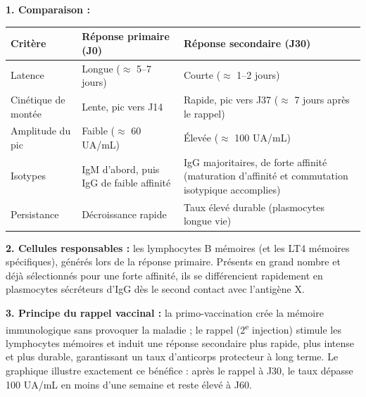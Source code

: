 \documentclass[11pt]{article}
\newcommand{\cle}[1]{{\popxbold\color{popdark}#1}}
\begin{document}
\begin{corrige}
\textbf{1. Comparaison :}
\begin{center}
\begin{tabularx}{\linewidth}{|l|X|X|}\hline
\rowcolor{popblueL}
\textbf{Critère} & \textbf{Réponse primaire (J0)} & \textbf{Réponse secondaire (J30)} \\ \hline
Latence & Longue ($\approx$ 5--7 jours) & Courte ($\approx$ 1--2 jours) \\ \hline
Cinétique de montée & Lente, pic vers J14 & Rapide, pic vers J37 ($\approx$ 7 jours après le rappel) \\ \hline
Amplitude du pic & Faible ($\approx$ 60 UA/mL) & Élevée ($\approx$ 100 UA/mL) \\ \hline
Isotypes & IgM d'abord, puis IgG de faible affinité & IgG majoritaires, de forte affinité (maturation d'affinité et commutation isotypique accomplies) \\ \hline
Persistance & Décroissance rapide & Taux élevé durable (plasmocytes longue vie) \\ \hline
\end{tabularx}
\end{center}

\textbf{2. Cellules responsables :} les \cle{lymphocytes B mémoires} (et les LT4 mémoires spécifiques), générés lors de la réponse primaire. Présents en grand nombre et déjà sélectionnés pour une forte affinité, ils se différencient rapidement en plasmocytes sécréteurs d'IgG dès le second contact avec l'antigène X.

\textbf{3. Principe du rappel vaccinal :} la primo-vaccination crée la mémoire immunologique sans provoquer la maladie ; le rappel (2\textsuperscript{e} injection) stimule les lymphocytes mémoires et induit une réponse secondaire plus rapide, plus intense et plus durable, garantissant un taux d'anticorps protecteur à long terme. Le graphique illustre exactement ce bénéfice : après le rappel à J30, le taux dépasse 100 UA/mL en moins d'une semaine et reste élevé à J60.
\end{corrige}
\end{document}
